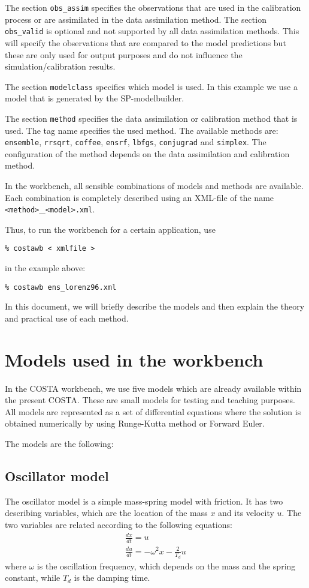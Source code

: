 \documentclass[a4paper,12pt]{article}
\begin{document}
The section {\tt obs\_assim} specifies the observations
that are used in the calibration process or are assimilated in the data
assimilation method. The section {\tt obs\_valid} is optional and not
supported by all data assimilation methods. This will specify the
observations that are compared to the model predictions but these are only
used for output purposes and do not influence the simulation/calibration
results.

The section {\tt modelclass} specifies which model is used. In this example
we use a model that is generated by the SP-modelbuilder.

The section {\tt method} specifies the data assimilation or calibration method
that is used. The tag name specifies the used method. The available methods
are: {\tt ensemble}, {\tt rrsqrt}, {\tt coffee}, {\tt ensrf},  
{\tt lbfgs}, {\tt conjugrad} and {\tt simplex}. The configuration of the
method depends on the data assimilation and calibration method.

In the workbench, all sensible combinations of models and methods are
available. Each combination is completely described using an XML-file of the
name {\tt <method>}\_{\tt <model>.xml}.

Thus, to run the workbench for a certain application, use \vspace{1cm}

{\tt \% costawb < xmlfile > } 
\vspace{1cm}

in the example above: 

{\tt \% costawb ens\_lorenz96.xml} 

 

 In this document, we will briefly describe the
models and then  explain the theory and practical use of each method.

   \section{Models used in the workbench}
   In the COSTA workbench, we use five models which are already available
   within the present COSTA. These are small models for testing and teaching
   purposes. All models are represented as a set of differential equations
   where the solution is obtained numerically by using Runge-Kutta method or
   Forward Euler.

The models are the following:
      \subsection{Oscillator model}
      The oscillator model is a simple mass-spring model with friction. It has two describing variables, which are the location of the mass $x$ and its velocity $u$. The two variables are related according to the following equations:
      \begin{eqnarray}
         \frac{dx}{dt}=u \\
         \frac{du}{dt}=-\omega^2 x - \frac{2}{T_{d}} u
      \end{eqnarray}
      where $\omega$ is the oscillation frequency, which depends on the mass and the spring constant, while $T_{d}$ is the damping time.
\end{document}
